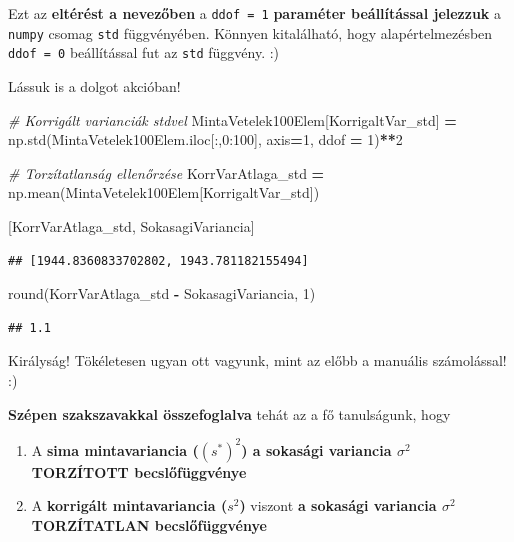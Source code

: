 \documentclass[
]{book}
\newenvironment{Shaded}{\begin{snugshade}}{\end{snugshade}}
\newcommand{\BuiltInTok}[1]{#1}
\newcommand{\CommentTok}[1]{\textcolor[rgb]{0.56,0.35,0.01}{\textit{#1}}}
\newcommand{\DecValTok}[1]{\textcolor[rgb]{0.00,0.00,0.81}{#1}}
\newcommand{\NormalTok}[1]{#1}
\newcommand{\OperatorTok}[1]{\textcolor[rgb]{0.81,0.36,0.00}{\textbf{#1}}}
\newcommand{\StringTok}[1]{\textcolor[rgb]{0.31,0.60,0.02}{#1}}
\providecommand{\tightlist}{%
  \setlength{\itemsep}{0pt}\setlength{\parskip}{0pt}}
\begin{document}
Ezt az \textbf{eltérést a nevezőben} a \texttt{ddof\ =\ 1} \textbf{paraméter beállítással jelezzuk} a \texttt{numpy} csomag \texttt{std} függvényében. Könnyen kitalálható, hogy alapértelmezésben \texttt{ddof\ =\ 0} beállítással fut az \texttt{std} függvény. :)

Lássuk is a dolgot akcióban!

\begin{Shaded}
\begin{Highlighting}[]
\CommentTok{\# Korrigált varianciák \textquotesingle{}std\textquotesingle{}{-}vel}
\NormalTok{MintaVetelek100Elem[}\StringTok{\textquotesingle{}KorrigaltVar\_std\textquotesingle{}}\NormalTok{] }\OperatorTok{=}\NormalTok{ np.std(MintaVetelek100Elem.iloc[:,}\DecValTok{0}\NormalTok{:}\DecValTok{100}\NormalTok{], axis}\OperatorTok{=}\DecValTok{1}\NormalTok{, ddof }\OperatorTok{=} \DecValTok{1}\NormalTok{)}\OperatorTok{**}\DecValTok{2}

\CommentTok{\# Torzítatlanság ellenőrzése}
\NormalTok{KorrVarAtlaga\_std }\OperatorTok{=}\NormalTok{ np.mean(MintaVetelek100Elem[}\StringTok{\textquotesingle{}KorrigaltVar\_std\textquotesingle{}}\NormalTok{])}

\NormalTok{[KorrVarAtlaga\_std, SokasagiVariancia]}
\end{Highlighting}
\end{Shaded}

\begin{verbatim}
## [1944.8360833702802, 1943.781182155494]
\end{verbatim}

\begin{Shaded}
\begin{Highlighting}[]
\BuiltInTok{round}\NormalTok{(KorrVarAtlaga\_std }\OperatorTok{{-}}\NormalTok{ SokasagiVariancia, }\DecValTok{1}\NormalTok{)}
\end{Highlighting}
\end{Shaded}

\begin{verbatim}
## 1.1
\end{verbatim}

Királyság! Tökéletesen ugyan ott vagyunk, mint az előbb a manuális számolással! :)

\textbf{Szépen szakszavakkal összefoglalva} tehát az a fő tanulságunk, hogy

\begin{enumerate}
\def\labelenumi{\arabic{enumi}.}
\tightlist
\item
  A \textbf{sima mintavariancia (\((s^*)^2\)) a sokasági variancia \(\sigma^2\) TORZÍTOTT becslőfüggvénye}
\item
  A \textbf{korrigált mintavariancia (\(s^2\))} viszont \textbf{a sokasági variancia \(\sigma^2\) TORZÍTATLAN becslőfüggvénye}
\end{enumerate}
\end{document}
